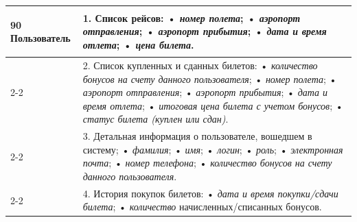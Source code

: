\begin{longtable}{|p{0.5cm}|p{15.5cm}|}
	\begin{rotatebox}[origin=r]{90}
		{\textbf{Пользователь}}
	\end{rotatebox}
	&
	1. Список рейсов: \newline
    • \textit{номер полета}; \newline
    • \textit{аэропорт отправления}; \newline
    • \textit{аэропорт прибытия}; \newline
    • \textit{дата и время отлета}; \newline
    • \textit{цена билета}. \\
	\cline{2-2}
    &
  2. Список купленных и сданных билетов: \newline
    • \textit{количество бонусов на счету данного пользователя}; \newline
    • \textit{номер полета}; \newline
    • \textit{аэропорт отправления}; \newline
    • \textit{аэропорт прибытия}; \newline
    • \textit{дата и время отлета}; \newline
    • \textit{итоговая цена билета с учетом бонусов}; \newline
    • \textit{статус билета (куплен или сдан)}. \\
	\cline{2-2}
    &
  3. Детальная информация о пользователе, вошедшем в систему; \newline
    • \textit{фамилия}; \newline
    • \textit{имя}; \newline
    • \textit{логин}; \newline
    • \textit{роль}; \newline
    • \textit{электронная почта}; \newline
    • \textit{номер телефона}; \newline
    • \textit{количество бонусов на счету данного пользователя}.\\
	\cline{2-2}
	&
	4. История покупок билетов: \newline
    • \textit{дата и время покупки/сдачи билета}; \newline
    • \textit{количество} начисленных/списанных бонусов. \\


\end{longtable}
